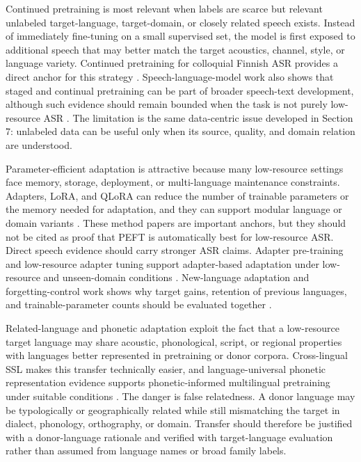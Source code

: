\documentclass[pdflatex,sn-basic]{sn-jnl}
\theoremstyle{thmstyleone}
\theoremstyle{thmstyletwo}
\theoremstyle{thmstylethree}
\begin{document}
Continued pretraining is most relevant when labels are scarce but relevant unlabeled target-language, target-domain, or closely related speech exists. Instead of immediately fine-tuning on a small supervised set, the model is first exposed to additional speech that may better match the target acoustics, channel, style, or language variety. Continued pretraining for colloquial Finnish ASR provides a direct anchor for this strategy \citep{getman24_interspeech}. Speech-language-model work also shows that staged and continual pretraining can be part of broader speech-text development, although such evidence should remain bounded when the task is not purely low-resource ASR \citep{tian25b_interspeech}. The limitation is the same data-centric issue developed in Section 7: unlabeled data can be useful only when its source, quality, and domain relation are understood.

Parameter-efficient adaptation is attractive because many low-resource settings face memory, storage, deployment, or multi-language maintenance constraints. Adapters, LoRA, and QLoRA can reduce the number of trainable parameters or the memory needed for adaptation, and they can support modular language or domain variants \citep{pmlr-v97-houlsby19a,hu2022lora,dettmers2023qlora}. These method papers are important anchors, but they should not be cited as proof that PEFT is automatically best for low-resource ASR. Direct speech evidence should carry stronger ASR claims. Adapter pre-training and low-resource adapter tuning support adapter-based adaptation under low-resource and unseen-domain conditions \citep{udupa24_interspeech}. New-language adaptation and forgetting-control work shows why target gains, retention of previous languages, and trainable-parameter counts should be evaluated together \citep{qian24_interspeech}.

Related-language and phonetic adaptation exploit the fact that a low-resource target language may share acoustic, phonological, script, or regional properties with languages better represented in pretraining or donor corpora. Cross-lingual SSL makes this transfer technically easier, and language-universal phonetic representation evidence supports phonetic-informed multilingual pretraining under suitable conditions \citep{feng23_interspeech}. The danger is false relatedness. A donor language may be typologically or geographically related while still mismatching the target in dialect, phonology, orthography, or domain. Transfer should therefore be justified with a donor-language rationale and verified with target-language evaluation rather than assumed from language names or broad family labels.
\end{document}
